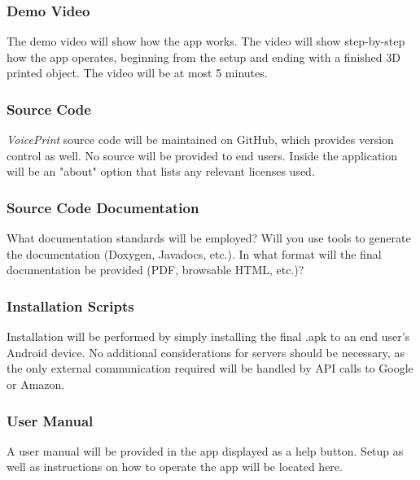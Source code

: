 \subsubsection{Demo Video}
The demo video will show how the app works. The video will show step-by-step how the app operates, beginning from the setup and ending with a finished 3D printed object. The video will be at most 5 minutes.

\subsubsection{Source Code}
\textit{VoicePrint} source code will be maintained on GitHub, which provides version control as well. No source will be provided to end users.  Inside the application will be an "about" option that lists any relevant licenses used.

\subsubsection{Source Code Documentation}
What documentation standards will be employed? Will you use tools to generate the documentation (Doxygen, Javadocs, etc.). In what format will the final documentation be provided (PDF, browsable HTML, etc.)?

\subsubsection{Installation Scripts}
Installation will be performed by simply installing the final .apk to an end user's Android device. No additional considerations for servers should be necessary, as the only external communication required will be handled by API calls to Google or Amazon.

\subsubsection{User Manual}
A user manual will be provided in the app displayed as a help button. Setup as well as instructions on how to operate the app will be located here.
